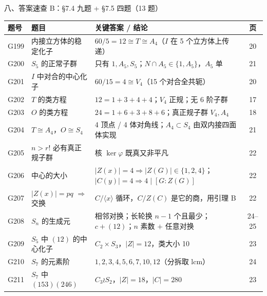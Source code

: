 \documentclass[aspectratio=169,10pt,fontset=none]{ctexbeamer}
\begin{document}
\begin{frame}[t]{八、答案速查 B：\S7.4 九题 + \S7.5 四题（13 题）}
  \centering
  \scriptsize
  \renewcommand{\arraystretch}{1.16}
  \setlength{\tabcolsep}{3pt}
  \begin{tabular}{@{}l l l c@{}}
    \toprule
    题号 & 题目 & 关键答案 / 结论 & 页\\
    \midrule
    G199 & 内接立方体的稳定化子 & $60/5=12\cong T\cong A_4$（$I$ 在 5 个立方体上传递） & 20\\
    G200 & $S_5$ 的正常子群 & 只有 $1,A_5,S_5$；$N\cap A_5\in\{1,A_5\}$，$A_5$ 单 & 21\\
    G201 & $I$ 中对合的中心化子 & $60/15=4\cong V_4$（15 个对合全共轭） & 20\\
    G202 & $T$ 的类方程 & $12=1+3+4+4$；$V_4$ 正规；无 6 阶子群 & 17\\
    G203 & $O$ 的类方程 & $24=1+6+3+8+6$；真正规子群 $V_4,A_4$ & 18\\
    G204 & $T\cong A_4$，$O\cong S_4$ & 4 顶点 / 4 体对角线；$A_4\subset S_4$ 由双内接四面体实现 & 21\\
    G205 & $n>r!$ 必有真正规子群 & 核 $\ker\varphi$ 既真又非平凡 & 22\\
    G206 & 中心的大小 & $|Z(x)|=4\Rightarrow|Z(G)|\in\{1,2,4\}$；$|C(y)|=4\Rightarrow4\mid[G:Z(G)]$ & 22\\
    G207 & $|Z(x)|=pq$ $\Rightarrow$ 交换 & $C/\langle x\rangle$ 循环，$C/Z(C)$ 是它的商，用引理 B & 22\\
    G208 & $S_n$ 的生成元 & 相邻对换；长轮换 $n-1$ 个且最少；$c+(12)$；$n$ 素数 $+$ 任意对换 & 24--25\\
    G209 & $S_5$ 中 $(12)$ 的中心化子 & $C_2\times S_3$，$|Z|=12$，类大小 10 & 23\\
    G210 & $S_7$ 的元素阶 & $1,2,3,4,5,6,7,10,12$（分拆取 lcm） & 24\\
    G211 & $S_7$ 中 $(153)(246)$ & $C_3\wr S_2$，$|Z|=18$，$|C|=280$ & 23\\
    \bottomrule
  \end{tabular}
\end{frame}
\end{document}
